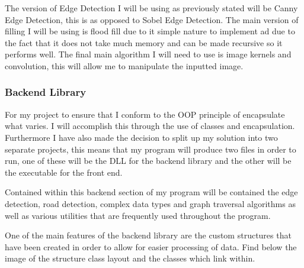 \begin{FlushLeft}
    \begin{figure}[H]
        \centering
    \end{figure}

    The version of Edge Detection I will be using as previously stated will be Canny Edge Detection, this is as opposed to Sobel Edge Detection. The main version of filling I will be using is flood fill due to it simple nature to implement ad due to the fact that it does not take much memory and can be made recursive so it performs well. The final main algorithm I will need to use is image kernels and convolution, this will allow me to manipulate the inputted image.

    \subsubsection{Backend Library}
    For my project to ensure that I conform to the OOP principle of encapsulate what varies. I will accomplish this through the use of classes and encapsulation. Furthermore I have also made the decision to split up my solution into two separate projects, this means that my program will produce two files in order to run, one of these will be the DLL for the backend library and the other will be the executable for the front end. \\ \bk

    Contained within this backend section of my program will be contained the edge detection, road detection, complex data types and graph traversal algorithms as well as various utilities that are frequently used throughout the program. \\ \bk

    One of the main features of the backend library are the custom structures that have been created in order to allow for easier processing of data. Find below the image of the structure class layout and the classes which link within.


\end{FlushLeft}
